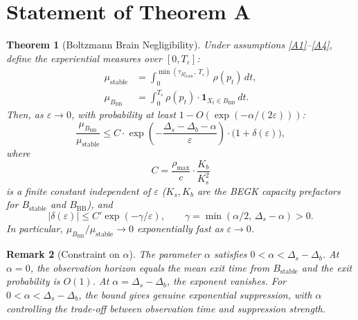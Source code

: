 \documentclass[11pt]{article}
\newtheorem{theorem}{Theorem}
\newtheorem{remark}[theorem]{Remark}
\newcommand{\eps}{\varepsilon}
\newcommand{\Ds}{\Delta_s}
\newcommand{\Db}{\Delta_b}
\newcommand{\Bstable}{B_{\mathrm{stable}}}
\newcommand{\BBB}{B_{\mathrm{BB}}}
\newcommand{\Teps}{T_\eps}
\newcommand{\muBB}{\mu_{\BBB}}
\begin{document}
\section{Statement of Theorem A}
\label{sec:statement}

\begin{theorem}[Boltzmann Brain Negligibility]\label{thm:A}
Under assumptions \ref{A1}--\ref{A4}, define the experiential
measures over $[0, \Teps]$:
\begin{align}
  \mu_{\mathrm{stable}}
  &= \int_0^{\min(\tau_{\Bstable^c},\, \Teps)}
    \rho(p_t)\, dt,
    \label{eq:mu-stable-def} \\
  \muBB
  &= \int_0^{\Teps} \rho(p_t) \cdot
    \mathbf{1}_{X_t \in \BBB}\, dt.
    \label{eq:mu-bb-def}
\end{align}
Then, as $\eps \to 0$, with probability at least
$1 - O(\exp(-\alpha/(2\eps)))$:
\begin{equation}\label{eq:theorem-a}
  \frac{\muBB}{\mu_{\mathrm{stable}}}
  \leq C \cdot \exp\!\left(
    -\frac{\Ds - \Db - \alpha}{\eps}
  \right)
  \cdot \bigl(1 + \delta(\eps)\bigr),
\end{equation}
where
\begin{equation}\label{eq:C-def}
  C = \frac{\rho_{\max}}{c} \cdot \frac{K_b}{K_s^2}
\end{equation}
is a finite constant independent of $\eps$ ($K_s, K_b$ are
the BEGK capacity prefactors for $\Bstable$ and $\BBB$), and
\begin{equation}\label{eq:delta-def}
  |\delta(\eps)| \leq C' \exp(-\gamma/\eps),
  \qquad \gamma = \min(\alpha/2,\, \Ds - \alpha) > 0.
\end{equation}
In particular, $\muBB / \mu_{\mathrm{stable}} \to 0$
exponentially fast as $\eps \to 0$.
\end{theorem}

\begin{remark}[Constraint on $\alpha$]
The parameter $\alpha$ satisfies $0 < \alpha < \Ds - \Db$.
At $\alpha = 0$, the observation horizon equals the mean exit time
from $\Bstable$ and the exit probability is $O(1)$.
At $\alpha = \Ds - \Db$, the exponent vanishes.
For $0 < \alpha < \Ds - \Db$, the bound gives genuine
exponential suppression, with $\alpha$ controlling the trade-off
between observation time and suppression strength.
\end{remark}
\end{document}
